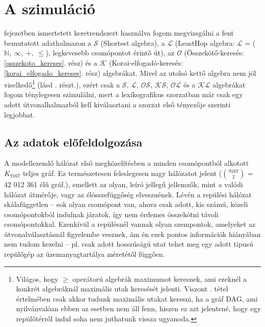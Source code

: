   \section{A szimuláció}
   fejezetben ismertetett keretrendszert használva fogom megvizsgálni a fent bemutatott adathalmazon a $\mathcal{S}$ (Shortest algebra), a $\mathcal{L}$ (LeastHop algebra: $\mathcal{L}$ = ($\mathbb{N},~\infty,~+,~\leq$), legkevesebb csomópontot érintő út), az $\mathcal{O}$ (Összekötő-keresés: \ref{osszekoto_kereses}. rész) és a $\mathcal{K}$ (Korai-elfogadó-keresés: \ref{korai_elfogado_kereses}. rész) algebrákat. Mivel az utolsó kettő algebra nem jól viselkedő\footnote{Világos, hogy $\geq$ operátorú algebrák maximumot keresnek, ami ezeknél a konkrét algebráknál maximális utak keresését jelenti. Viszont . tétel értelmében csak akkor tudunk maximális utakat keresni, ha a gráf DAG, ami nyilvánvalóan ebben az esetben nem áll fenn, hiszen ez azt jelentené, hogy egy repülőtérről indul soha nem juthatunk vissza ugyanoda.} (lásd . részt.), ezért csak a $\mathcal{S}$, $\mathcal{L}$, $\mathcal{OS}$, $\mathcal{KS}$, $\mathcal{OL}$ és a $\mathcal{KL}$ algebrákat fogom ténylegesen szimulálni, mert a lexikografikus szorzatban már csak egy adott útvonalhalmazból kell kiválasztani a szorzat első tényezője szerinti legjobbat.

    \subsection{Az adatok előfeldolgozása}
    A modellezendő hálózat első megközelítésben a minden csomópontból alkotott $K_{9167}$ teljes gráf. Ez természetesen feleslegesen nagy hálózatot jelent ($9167 \choose 2$ = 42 012 361 élű gráf.), emellett az olyan, leíró jellegű jellemzők, mint a valódi hálózat átmérője, vagy az élösszefüggőség elvesznének. Lévén a repülési hálózat skálafüggetlen -- sok olyan csomópont van, ahova csak adott, kis számú, közeli csomópontokból indulnak járatok, így nem érdemes összekötni távoli csomópontokkal. Ezenkívül a repülésnél vannak olyan szempontok, amelyeket az útvonalválasztásnál figyelembe vesznek, ám én ezek pontos információk hiányában nem tudom kezelni -- pl. csak adott hosszúságú utat tehet meg egy adott típusú repülőgép az üzemanyagtartálya méretétől függően.\\

